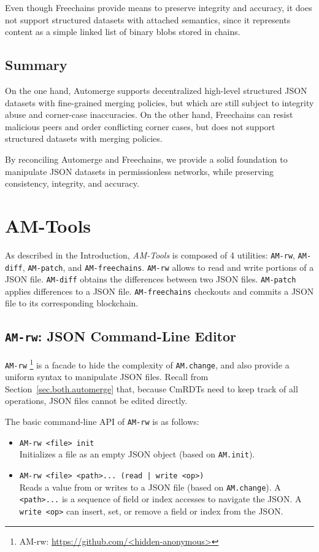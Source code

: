\documentclass[12pt]{article}
\newcommand{\AMT}      {\emph{AM-Tools}\xspace}
\newcommand{\code}[1]  {\texttt{\footnotesize{#1}}}
\begin{document}
Even though Freechains provide means to preserve integrity and accuracy, it
does not support structured datasets with attached semantics, since it
represents content as a simple linked list of binary blobs stored in chains.

\subsection{Summary}

On the one hand, Automerge supports decentralized high-level structured JSON
datasets with fine-grained merging policies, but which are still subject to
integrity abuse and corner-case inaccuracies.
%
On the other hand, Freechains can resist malicious peers and order conflicting
corner cases, but does not support structured datasets with merging policies.

By reconciling Automerge and Freechains, we provide a solid foundation to
manipulate JSON datasets in permissionless networks, while preserving
consistency, integrity, and accuracy.

\section{AM-Tools}
\label{sec.amtools}

As described in the Introduction, \AMT is composed of 4 utilities:
    \code{AM-rw}, \code{AM-diff}, \code{AM-patch}, and \code{AM-freechains}.
%
\code{AM-rw} allows to read and write portions of a JSON file.
\code{AM-diff} obtains the differences between two JSON files.
\code{AM-patch} applies differences to a JSON file.
\code{AM-freechains} checkouts and commits a JSON file to its corresponding
blockchain.

\subsection{\code{AM-rw}: JSON Command-Line Editor}

\code{AM-rw}%
    \footnote{AM-rw: \url{https://github.com/<hidden-anonymous>}}
is a facade to hide the complexity of \code{AM.change}, and also provide a
uniform syntax to manipulate JSON files.
Recall from Section~\ref{sec.both.automerge} that, because CmRDTs need to keep
track of all operations, JSON files cannot be edited directly.

The basic command-line API of \code{AM-rw} is as follows:

\begin{itemize}
\item \code{AM-rw <file> init} \\
    Initializes a file as an empty JSON object (based on \code{AM.init}).
\item \code{AM-rw <file> <path>... (read | write <op>)} \\
    Reads a value from or writes to a JSON file (based on \code{AM.change}).
    A \code{<path>...} is a sequence of field or index accesses to navigate the
    JSON.
    A \code{write <op>} can insert, set, or remove a field or index from the
    JSON.
\end{itemize}
\end{document}
